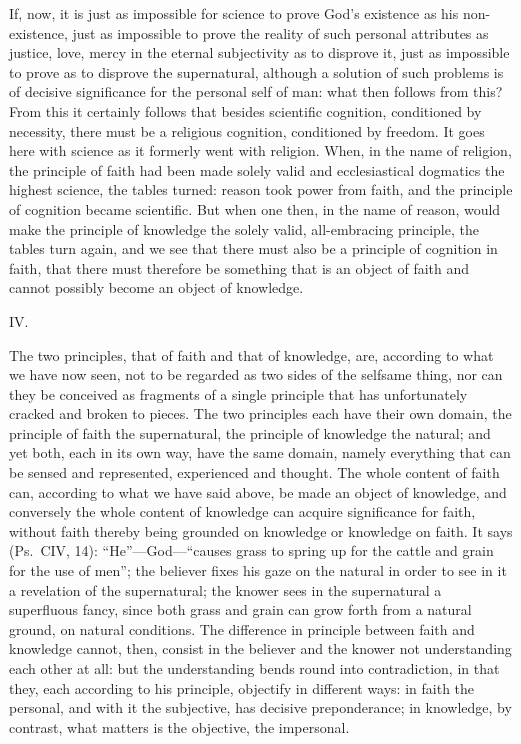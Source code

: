 \documentclass[12pt,a4paper]{article}
\newcommand{\opage}[1]{\marginnote{\footnotesize\textit{[#1]}}}
\begin{document}
If, now, it is just as impossible for science to prove God's existence
as his non-existence, just as impossible to prove the reality of such
personal attributes as justice, love, mercy in the eternal subjectivity
as to disprove it, just as impossible to prove as to disprove the
supernatural, although a solution of such problems is of decisive
significance for the personal self of man: what then follows from
this? From this it certainly follows that besides scientific
cognition, conditioned by necessity, there must be a religious
cognition, conditioned by freedom. It goes here with science as it
formerly went with religion. When, in the name of religion, the
principle of faith had been made solely valid and ecclesiastical
dogmatics the highest science, the tables turned: reason took power
from faith, and the principle of cognition became scientific. But when
one then, in the name of reason, would make the principle of knowledge
the solely valid, all-embracing principle, the tables turn again, and
we see that there must also be a principle of cognition in faith, that
there must therefore be something that is an object of faith and
cannot possibly become an object of knowledge.

\begin{center}IV.\end{center}

The two principles, that of faith and that of knowledge, are,
according to what we have now seen, not to be regarded as two sides
of the selfsame thing, nor
\opage{44}can they be conceived as fragments of a single principle that has
unfortunately cracked and broken to pieces. The two principles each have
their own domain, the principle of faith the supernatural, the principle
of knowledge the natural; and yet both, each in its own way, have the same
domain, namely everything that can be sensed and represented, experienced
and thought. The whole content of faith can, according to what we have
said above, be made an object of knowledge, and conversely the whole
content of knowledge can acquire significance for faith, without faith
thereby being grounded on knowledge or knowledge on faith. It says
(Ps.\ CIV, 14): ``He''---God---``causes grass to spring up for the cattle
and grain for the use of men''; the believer fixes his gaze on the
natural in order to see in it a revelation of the supernatural; the
knower sees in the supernatural a superfluous fancy, since both grass and
grain can grow forth from a natural ground, on natural conditions. The
difference in principle between faith and knowledge cannot, then,
consist in the believer and the knower not understanding each other at
all: but the understanding bends round into contradiction, in that they,
each according to his principle, objectify in different ways: in faith
the personal, and with it the subjective, has decisive preponderance; in
knowledge, by contrast, what matters is the objective, the impersonal.
\end{document}

